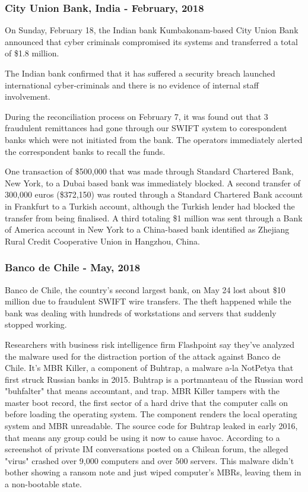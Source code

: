\documentclass[12pt]{article}
\begin{document}
        
    \subsubsection{City Union Bank, India -  February, 2018}
        On Sunday, February 18, the Indian bank Kumbakonam-based City Union Bank announced that cyber criminals compromised its systems and transferred a total of \$1.8 million.  
        
        The Indian bank confirmed that it has suffered a security breach launched international cyber-criminals and there is no evidence of internal staff involvement. 
        
        During the reconciliation process on February 7, it was found out that 3 fraudulent remittances had gone through our SWIFT system to corespondent banks which were not initiated from the bank. The operators immediately alerted the correspondent banks to recall the funds.

        One transaction of \$500,000 that was made through Standard Chartered Bank, New York, to a Dubai based bank was immediately blocked. A second transfer of 300,000 euros (\$372,150) was routed through a Standard Chartered Bank account in Frankfurt to a Turkish account, although the Turkish lender had blocked the transfer from being finalised. A third totaling \$1 million was sent through a Bank of America account in New York to a China-based bank identified as Zhejiang Rural Credit Cooperative Union in Hangzhou, China.\cite{CityUnionBank2018}\cite{IndiaCityUnion2018}

        
    \subsubsection{Banco de Chile - May, 2018}
        Banco de Chile, the country's second largest bank, on May 24 lost about \$10 million due to fraudulent SWIFT wire transfers. The theft happened while the bank was dealing with hundreds of workstations and servers that suddenly stopped working.
        
        Researchers with business risk intelligence firm Flashpoint say they've analyzed the malware used for the distraction portion of the attack against Banco de Chile. It's MBR Killer, a component of Buhtrap, a malware a-la NotPetya that first struck Russian banks in 2015. Buhtrap is a portmanteau of the Russian word "buhfalter" that means accountant, and trap. MBR Killer tampers with the master boot record, the first sector of a hard drive that the computer calls on before loading the operating system. The component renders the local operating system and MBR unreadable. The source code for Buhtrap leaked in early 2016, that means any group could be using it now to cause havoc. According to a screenshot of private IM conversations posted on a Chilean forum, the alleged "virus" crashed over 9,000 computers and over 500 servers. This malware didn't bother showing a ransom note and just wiped computer's MBRs, leaving them in a non-bootable state.
        
\end{document}
